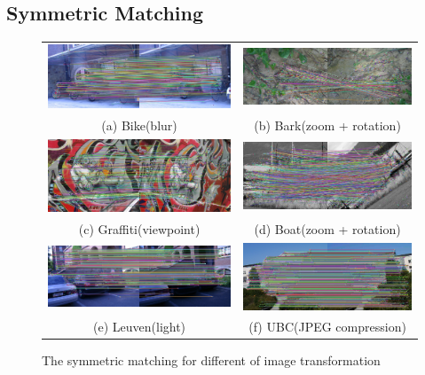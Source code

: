 \subsection {Symmetric Matching}
\begin{figure}[H]
\begin{tabular}{cc}
  \includegraphics[width=75mm]{figures/bike_sym_1_3} &  \includegraphics[width=75mm]{figures/barks_sym_1_3} \\
(a) Bike(blur) & (b) Bark(zoom + rotation) \\[6pt]
 \includegraphics[width=75mm]{figures/graffiti_sym_1_3} &  \includegraphics[width=75mm]{figures/boat_sym_1_3} \\
(c) Graffiti(viewpoint) & (d) Boat(zoom + rotation) \\[6pt]
 \includegraphics[width=75mm]{figures/leuven_sym_1_3} &  \includegraphics[width=75mm]{figures/ubc_sym_1_3} \\
(e) Leuven(light) & (f) UBC(JPEG compression) \\[6pt]
\end{tabular}
\caption{The symmetric matching for different of image transformation}\label{fig:symmetric_matching}
\end{figure}

